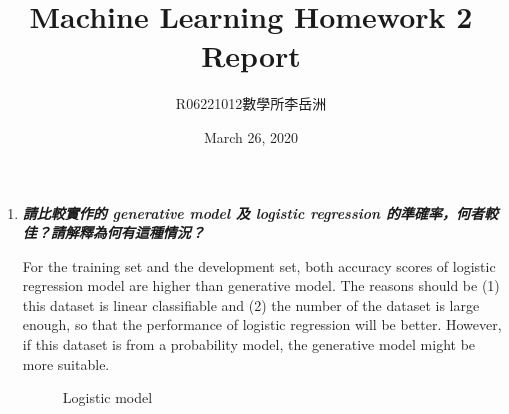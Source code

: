 \documentclass[a4paper,11pt]{article}
\title{Machine Learning Homework 2 Report}
\author{R06221012\hspace{0.2cm}數學所\hspace{0.2cm}李岳洲}
\date{March 26, 2020}
\begin{document}
\maketitle

\begin{enumerate}
	\item \textit{\textbf{請比較實作的 generative model 及 logistic regression 的準確率，何者較佳？請解釋為何有這種情況？}}

	For the training set and the development set, both accuracy scores of logistic regression model are higher than generative model. The reasons should be (1) this dataset is linear classifiable and (2) the number of the dataset is large enough, so that the performance of logistic regression will be better. However, if this dataset is from a probability model, the generative model might be more suitable.\\

	\begin{figure}[htp]
	    \begin{center}
	    	\quad
	    	\caption{Logistic model}
	    \end{center}
	\end{figure}


\end{enumerate}
\end{document}
